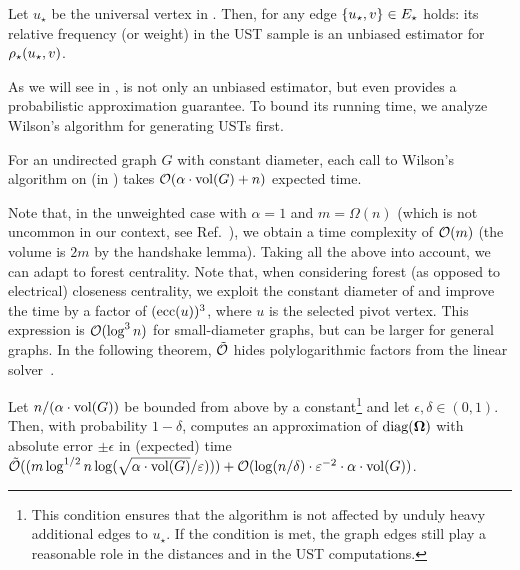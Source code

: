 \begin{proposition}
Let $u_\star$ be the universal vertex in \gstar. Then, for any edge
$\set{u_\star, v} \in E_\star$ holds: its relative frequency (or weight)
in the UST sample is an unbiased estimator for $\rho_{\star}(u_\star, v)$.
\end{proposition}

As we will see in ,  is
not only an unbiased estimator, but even provides a probabilistic approximation
guarantee. To bound its running time, we analyze Wilson's algorithm for
generating USTs first.

\begin{proposition}
For an undirected graph $G$ with constant diameter, each call to Wilson's
algorithm on \gstar (in ) takes
$\mathcal{O}(\alpha\cdot\text{vol}(G) + n)$ expected time.
\end{proposition}

Note that, in the unweighted case with $\alpha = 1$ and $m = \Omega(n)$ (which
is not uncommon in our context, see \eg Ref.~\cite{DBLP:conf/icdm/JinBZ19}),
we obtain a time complexity of $\mathcal{O}(m)$ (the volume is $2m$ by the handshake
lemma).
Taking all the above into account, we can adapt 
to forest centrality. Note that, when considering forest (as opposed to electrical)
closeness centrality, we exploit the constant diameter of \gstar and improve
the time by a factor of $(\text{ecc}(u))^3$, where $u$ is the selected pivot vertex.
This expression is $\mathcal{O}(\log^3n)$ for small-diameter graphs, but can be larger for
general graphs. In the following theorem, $\tilde{\mathcal{O}}$ hides polylogarithmic factors
from the linear solver~\cite{DBLP:conf/stoc/CohenKMPPRX14}.

\begin{theorem}
\label{theo:el-clos:forest-apx}
Let $n / (\alpha\cdot\text{vol}(G))$ be bounded from above by a constant\footnote{This
condition ensures that the algorithm is not affected by unduly heavy additional edges
to $u_\star$. If the condition is met, the graph edges still play a reasonable role in
the distances and in the UST computations.} and let $\epsilon,\delta\in(0, 1)$. Then,
with probability $1 - \delta$,  computes an approximation
of $\diag{\Fmat}$ with absolute error $\pm\epsilon$ in (expected) time
$\tilde{\mathcal{O}}((m \log^{1/2} n\log(\sqrt{\alpha\cdot\text{vol}(G)} / \varepsilon))) +
\mathcal{O}(\log(n / \delta)\cdot\varepsilon^{-2}\cdot\alpha\cdot\text{vol}(G))$.
\end{theorem}

